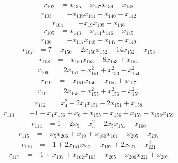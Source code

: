 \[\begin{aligned}
r_{102}&=x_{135}-x_{137}x_{139}-x_{138}
\end{aligned}\]
\[\begin{aligned}
r_{103}&=-x_{139}x_{141}+x_{140}-x_{142}
\end{aligned}\]
\[\begin{aligned}
r_{104}&=-x_{19}x_{109}+x_{146}
\end{aligned}\]
\[\begin{aligned}
r_{105}&=x_{143}-x_{144}x_{146}-x_{145}
\end{aligned}\]
\[\begin{aligned}
r_{106}&=-x_{117}x_{148}+x_{147}-x_{149}
\end{aligned}\]
\[\begin{aligned}
r_{107}&=7+x_{150}-2x_{150}x_{152}-14x_{152}+x_{153}
\end{aligned}\]
\[\begin{aligned}
r_{108}&=-x_{150}x_{153}-8x_{153}+x_{154}
\end{aligned}\]
\[\begin{aligned}
r_{109}&=2x_{151}+x_{151}^{2}+x_{153}^{2}-x_{154}^{2}
\end{aligned}\]
\[\begin{aligned}
r_{110}&=-x_{151}x_{156}-x_{156}+x_{157}
\end{aligned}\]
\[\begin{aligned}
r_{111}&=2x_{155}+x_{155}^{2}+x_{156}^{2}-x_{157}^{2}
\end{aligned}\]
\[\begin{aligned}
r_{112}&=x_{4}^{2}-2x_{4}x_{151}-2x_{151}+x_{158}
\end{aligned}\]
\[\begin{aligned}
r_{113}&=-1-x_{4}x_{156}+x_{6}-x_{155}-x_{156}+x_{157}+x_{158}x_{159}
\end{aligned}\]
\[\begin{aligned}
r_{114}&=1-2x_{5}+x_{5}^{2}-2x_{5}x_{151}+x_{160}
\end{aligned}\]
\[\begin{aligned}
r_{115}&=-x_{5}x_{206}+x_{19}+x_{160}x_{161}-x_{205}+x_{207}
\end{aligned}\]
\[\begin{aligned}
r_{116}&=-1+2x_{151}x_{221}-x_{162}+2x_{221}-x_{221}^{2}
\end{aligned}\]
\[\begin{aligned}
r_{117}&=-1+x_{107}+x_{162}x_{163}-x_{205}-x_{206}x_{221}+x_{207}
\end{aligned}\]
